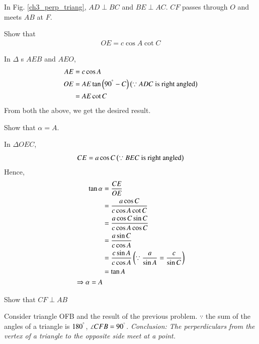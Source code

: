 	In Fig. \ref{ch3_perp_triang}, $AD \perp BC$ and $BE \perp AC$. $CF$ passes through $O$ and meets
	$AB$ at $F$.  	
\begin{problem}
	Show that 
	\begin{align}
	OE = c \cos A \cot C
	\end{align}
\end{problem}
\proof In $\Delta$ s $AEB$ and $AEO$,
%
\begin{align}
AE &= c \cos A \\
OE &= AE \tan \left(90^{\degree} - C\right) \left(\because ADC \text{ is right angled}\right) \\
&= AE \cot C
\end{align}
%
From both the above, we get the desired result.
%
\begin{problem}
	Show that $\alpha = A$.
\end{problem}
\proof In $\Delta OEC$,
%
\begin{equation}
CE = a \cos C \left(\because BEC \text{ is right angled}\right)
\end{equation}
%
Hence,
%
\begin{equation}
\begin{split}
\tan \alpha &= \frac{CE}{OE} \\
&=  \frac{a \cos C}{c \cos A \cot C} \\
&=  \frac{a \cos C \sin C}{c \cos A \cos C} \\
&= \frac{a \sin C}{c \cos A } \\
&= \frac{c \sin A}{c \cos A } \left(\because \frac{a}{\sin A} = \frac{c}{\sin C}\right)\\
&= \tan A\\
\Rightarrow \alpha = A
\end{split}
\end{equation}
%
\begin{problem}
	Show that $CF \perp AB$
\end{problem}
\proof Consider triangle OFB and the result of the previous problem.  $\because$ the sum of the angles of a triangle is $180^{\degree}$, $\angle CFB = 90^{\degree}$.
{\em Conclusion: The perperdiculars from the vertex of a triangle to the opposite side meet at a point.}
